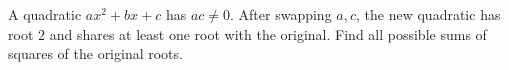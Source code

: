 A quadratic $ax^2+bx+c$ has $ac\ne0$. After swapping $a,c$, the new quadratic has root $2$ and shares at least one root with the original. Find all possible sums of squares of the original roots.
